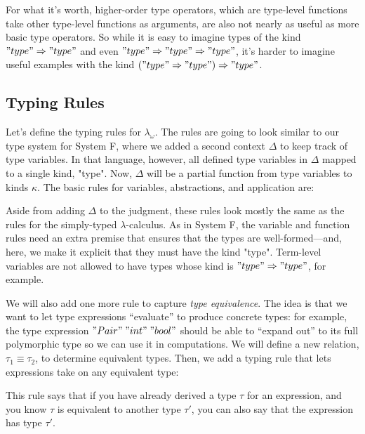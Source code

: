 For what it's worth, higher-order type operators, which are type-level
functions take other type-level functions as arguments, are also not nearly as
useful as more basic type operators.
So while it is easy to imagine types of the kind $"type" \Rightarrow "type"$
and even $"type" \Rightarrow "type" \Rightarrow "type"$, it's harder to
imagine useful examples with the kind $("type" \Rightarrow "type") \Rightarrow
"type"$.

\subsection{Typing Rules}

Let's define the typing rules for $\lambda_\omega$.
The rules are going to look similar to our type system for System F, where we
added a second context $\Delta$ to keep track of type variables.
In that language, however, all defined type variables in $\Delta$ mapped to a
single kind, "type".
Now, $\Delta$ will be a partial function from type variables to kinds
$\kappa$.
The basic rules for variables, abstractions, and application are:
%
%
Aside from adding $\Delta$ to the judgment, these rules look mostly the same
as the rules for the simply-typed $\lambda$-calculus.
As in System F, the variable and function rules need an extra premise that
ensures that the types are well-formed---and, here, we make it explicit that
they must have the kind "type".
Term-level variables are not allowed to have types whose kind is $"type"
\Rightarrow "type"$, for example.

We will also add one more rule to capture \emph{type equivalence}.
The idea is that we want to let type expressions ``evaluate'' to produce
concrete types: for example, the type expression $"Pair" \; "int" \; "bool"$
should be able to ``expand out'' to its full polymorphic type so we can
use it in computations.
We will define a new relation, $\tau_1 \equiv \tau_2$, to determine equivalent
types.
Then, we add a typing rule that lets expressions take on any equivalent type:
%
%
This rule says that if you have already derived a type $\tau$ for an
expression, and you know $\tau$ is equivalent to another type $\tau'$, you can
also say that the expression has type $\tau'$.


